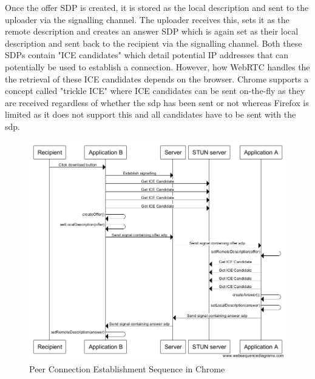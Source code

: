 \documentclass[]{report}
\begin{document}
			Once the offer SDP is created, it is stored as the local description and sent to the uploader via the signalling channel. The uploader receives this, sets it as the remote description and creates an answer SDP which is again set as their local description and sent back to the recipient via the signalling channel. Both these SDPs contain "ICE candidates" which detail potential IP addresses that can potentially be used to establish a connection. However, how WebRTC handles the the retrieval of these ICE candidates depends on the browser. Chrome supports a concept called "trickle ICE" where ICE candidates can be sent on-the-fly as they are received regardless of whether the sdp has been sent or not whereas Firefox is limited as it does not support this and all candidates have to be sent with the sdp. 
			
						
			\begin{figure}[H]
				\caption{Peer Connection Establishment Sequence in Chrome}
				\centering
				\includegraphics[scale=0.5]{peer-connection-establishment-sequence-chrome.png}
			\end{figure}
			
\end{document}
